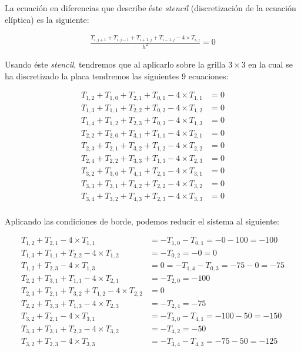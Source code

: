 La ecuación en diferencias que describe éste \textit{stencil} (discretización de la ecuación elíptica) es la siguiente:

\begin{align}
    \frac{T_{i,j+1} + T_{i,j-1} + T_{i+1,j} + T_{i-1,j} - 4 \times T_{i, j}}{h^2} = 0
\end{align}

Usando éste \textit{stencil}, tendremos que al aplicarlo sobre la grilla $3 \times 3$ en la cual se ha discretizado la placa tendremos las siguientes 9 ecuaciones:

\begin{align*}
T_{1,2} + T_{1,0} + T_{2,1} + T_{0,1} - 4 \times T_{1, 1} &= 0\\
T_{1,3} + T_{1,1} + T_{2,2} + T_{0,2} - 4 \times T_{1, 2} &= 0\\
T_{1,4} + T_{1,2} + T_{2,3} + T_{0,3} - 4 \times T_{1, 3} &= 0\\
T_{2,2} + T_{2,0} + T_{3,1} + T_{1,1} - 4 \times T_{2, 1} &= 0\\
T_{2,3} + T_{2,1} + T_{3,2} + T_{1,2} - 4 \times T_{2, 2} &= 0\\
T_{2,4} + T_{2,2} + T_{3,3} + T_{1,3} - 4 \times T_{2, 3} &= 0\\
T_{3,2} + T_{3,0} + T_{4,1} + T_{2,1} - 4 \times T_{3, 1} &= 0\\
T_{3,3} + T_{3,1} + T_{4,2} + T_{2,2} - 4 \times T_{3, 2} &= 0\\
T_{3,4} + T_{3,2} + T_{4,3} + T_{2,3} - 4 \times T_{3, 3} &= 0\\
\end{align*}

Aplicando las condiciones de borde, podemos reducir el sistema al siguiente:

\begin{align*}
T_{1,2} + T_{2,1} - 4 \times T_{1, 1} &= - T_{1,0} - T_{0,1} = -0 - 100 = -100\\
T_{1,3} + T_{1,1} + T_{2,2} - 4 \times T_{1, 2} &= -T_{0,2} = -0 = 0\\
T_{1,2} + T_{2,3} - 4 \times T_{1, 3} &= 0 = -T_{1,4} - T_{0,3} = -75 - 0 = -75 \\
T_{2,2} + T_{3,1} + T_{1,1} - 4 \times T_{2, 1} &= -T_{2,0} = -100 \\
T_{2,3} + T_{2,1} + T_{3,2} + T_{1,2} - 4 \times T_{2, 2} &= 0\\
T_{2,2} + T_{3,3} + T_{1,3} - 4 \times T_{2, 3} &= -T_{2,4} = -75\\
T_{3,2} + T_{2,1} - 4 \times T_{3, 1} &= -T_{3,0} - T_{4,1} = -100 -50 = -150\\
T_{3,3} + T_{3,1} + T_{2,2} - 4 \times T_{3, 2} &= -T_{4,2} = -50\\
T_{3,2} + T_{2,3} - 4 \times T_{3, 3} &= -T_{3,4} - T_{4,3} = -75 - 50 = -125\\
\end{align*}


